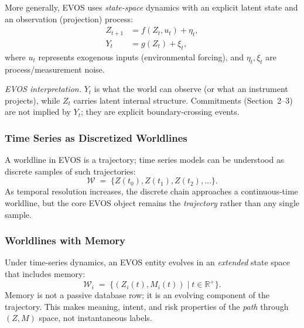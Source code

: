 \documentclass[11pt]{article}
\begin{document}
More generally, EVOS uses \emph{state-space} dynamics with an explicit latent state and an
observation (projection) process:
\begin{align}
Z_{t+1} &= f(Z_t, u_t) + \eta_t, \\
Y_t &= g(Z_t) + \xi_t,
\end{align}
where $u_t$ represents exogenous inputs (environmental forcing), and $\eta_t,\xi_t$ are
process/measurement noise.

\emph{EVOS interpretation.} $Y_t$ is what the world can observe (or what an instrument
projects), while $Z_t$ carries latent internal structure. Commitments (Section~2--3)
are not implied by $Y_t$; they are explicit boundary-crossing events.

\subsubsection{Time Series as Discretized Worldlines}

A worldline in EVOS is a trajectory; time series models can be understood as discrete
samples of such trajectories:
\[
\mathcal{W} \;=\; \{Z(t_0), Z(t_1), Z(t_2), \dots\}.
\]
As temporal resolution increases, the discrete chain approaches a continuous-time
worldline, but the core EVOS object remains the \emph{trajectory} rather than any single
sample.

\subsubsection{Worldlines with Memory}
\label{sec:worldlines-with-memory}

Under time-series dynamics, an EVOS entity evolves in an \emph{extended} state space that
includes memory:
\[
\mathcal{W}_i \;=\; \{ (Z_i(t), M_i(t)) \mid t \in \mathbb{R}^+ \}.
\]
Memory is not a passive database row; it is an evolving component of the trajectory.
This makes meaning, intent, and risk properties of the \emph{path} through $(Z,M)$ space,
not instantaneous labels.
\end{document}
